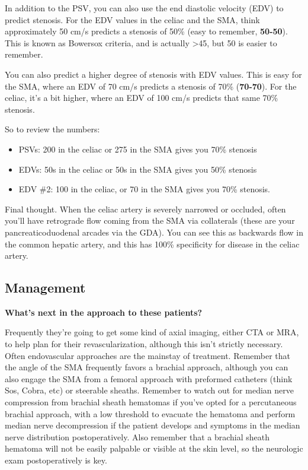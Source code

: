 \documentclass[
]{book}
\begin{document}
In addition to the PSV, you can also use the end diastolic velocity
(EDV) to predict stenosis. For the EDV values in the celiac and the SMA,
think approximately 50 cm/s predicts a stenosis of 50\% (easy to
remember, \textbf{50-50}). This is known as Bowersox criteria, and is
actually \textgreater45, but 50 is easier to
remember.\citep{bowersoxDuplexUltrasonographyDiagnosis1991}

You can also predict a higher degree of stenosis with EDV values. This
is easy for the SMA, where an EDV of 70 cm/s predicts a stenosis of 70\%
(\textbf{70-70}). For the celiac, it's a bit higher, where an EDV of 100 cm/s
predicts that same 70\% stenosis.

So to review the numbers: \citep{monetaDuplexUltrasoundCriteria1991, monetaMesentericDuplexScanning1993, zwolakMesentericCeliacDuplex1998, aburahma2012}

\begin{itemize}
\item
  PSVs: 200 in the celiac or 275 in the SMA gives you 70\% stenosis
\item
  EDVs: 50s in the celiac or 50s in the SMA gives you 50\% stenosis
\item
  EDV \#2: 100 in the celiac, or 70 in the SMA gives you 70\% stenosis.
\end{itemize}

Final thought. When the celiac artery is severely narrowed or occluded,
often you'll have retrograde flow coming from the SMA via collaterals
(these are your pancreaticoduodenal arcades via the GDA). You can see
this as backwards flow in the common hepatic artery, and this has 100\%
specificity for disease in the celiac
artery.\citep{warnckeSuperiorMesentericArtery2019}

\hypertarget{management-24}{%
\subsection{Management}\label{management-24}}

\textbf{What's next in the approach to these patients?}

Frequently they're going to get some kind of axial imaging, either CTA
or MRA, to help plan for their revascularization, although this isn't
strictly necessary. Often endovascular approaches are the mainstay of
treatment. Remember that the angle of the SMA frequently favors a
brachial approach, although you can also engage the SMA from a femoral
approach with preformed catheters (think Sos, Cobra, etc) or steerable
sheaths. Remember to watch out for median nerve compression from
brachial sheath hematomas if you've opted for a percutaneous brachial
approach, with a low threshold to evacuate the hematoma and perform
median nerve decompression if the patient develops and symptoms in the
median nerve distribution postoperatively. Also remember that a brachial
sheath hematoma will not be easily palpable or visible at the skin
level, so the neurologic exam postoperatively is key.
\end{document}
